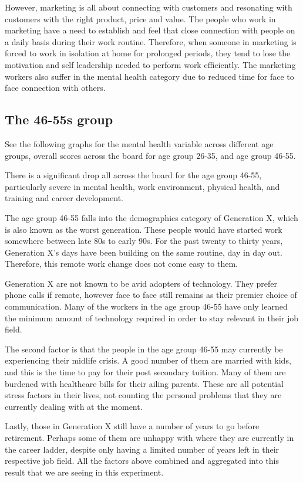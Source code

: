 \documentclass[12pt]{article}
\begin{document}
However, marketing is all about connecting with customers and resonating with customers with the right product, price and value. The people who work in marketing have a need to establish and feel that close connection with people on a daily basis during their work routine. Therefore, when someone in marketing is forced to work in isolation at home for prolonged periods, they tend to lose the motivation and self leadership needed to perform work efficiently. The marketing workers also suffer in the mental health category due to reduced time for face to face connection with others. 

\subsection*{The 46-55s group}

See the following graphs for the mental health variable across different age groups, overall scores across the board for age group 26-35, and age group 46-55.

There is a significant drop all across the board for the age group 46-55, particularly severe in mental health, work environment, physical health, and training and career development.

The age group 46-55 falls into the demographics category of Generation X, which is also known as the worst generation. These people would have started work somewhere between late 80s to early 90s. For the past twenty to thirty years, Generation X’s days have been building on the same routine, day in day out. Therefore, this remote work change does not come easy to them.

Generation X are not known to be avid adopters of technology. They prefer phone calls if remote, however face to face still remains as their premier choice of communication. Many of the workers in the age group 46-55 have only learned the minimum amount of technology required in order to stay relevant in their job field.

The second factor is that the people in the age group 46-55 may currently be experiencing their midlife crisis. A good number of them are married with kids, and this is the time to pay for their post secondary tuition. Many of them are burdened with healthcare bills for their ailing parents. These are all potential stress factors in their lives, not counting the personal problems that they are currently dealing with at the moment. 

Lastly, those in Generation X still have a number of years to go before retirement. Perhaps some of them are unhappy with where they are currently in the career ladder, despite only having a limited number of years left in their respective job field. 
All the factors above combined and aggregated into this result that we are seeing in this experiment. 
\end{document}
